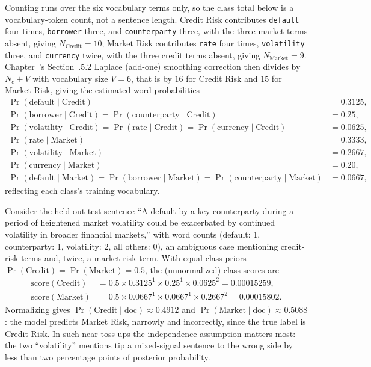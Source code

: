 \documentclass[../ai_in_finance]{subfiles}
\begin{document}
Counting runs over the six vocabulary terms only, so the class total below is a vocabulary-token count, not a sentence length. Credit Risk contributes \texttt{default} four times, \texttt{borrower} three, and \texttt{counterparty} three, with the three market terms absent, giving $N_{\text{Credit}} = 10$; Market Risk contributes \texttt{rate} four times, \texttt{volatility} three, and \texttt{currency} twice, with the three credit terms absent, giving $N_{\text{Market}} = 9$. Chapter~'s Section~.5.2 Laplace (add-one) smoothing correction then divides by $N_c + V$ with vocabulary size $V = 6$, that is by $16$ for Credit Risk and $15$ for Market Risk, giving the estimated word probabilities
\begin{align*}
\Pr(\text{default}\mid\text{Credit}) &= 0.3125, \\
\Pr(\text{borrower}\mid\text{Credit}) = \Pr(\text{counterparty}\mid\text{Credit}) &= 0.25, \\
\Pr(\text{volatility}\mid\text{Credit}) = \Pr(\text{rate}\mid\text{Credit}) = \Pr(\text{currency}\mid\text{Credit}) &= 0.0625, \\[4pt]
\Pr(\text{rate}\mid\text{Market}) &= 0.3333, \\
\Pr(\text{volatility}\mid\text{Market}) &= 0.2667, \\
\Pr(\text{currency}\mid\text{Market}) &= 0.20, \\
\Pr(\text{default}\mid\text{Market}) = \Pr(\text{borrower}\mid\text{Market}) = \Pr(\text{counterparty}\mid\text{Market}) &= 0.0667,
\end{align*}
reflecting each class's training vocabulary.


Consider the held-out test sentence ``A default by a key counterparty during a period of heightened market volatility could be exacerbated by continued volatility in broader financial markets,'' with word counts (default: 1, counterparty: 1, volatility: 2, all others: 0), an ambiguous case mentioning credit-risk terms and, twice, a market-risk term. With equal class priors $\Pr(\text{Credit}) = \Pr(\text{Market}) = 0.5$, the (unnormalized) class scores are
\begin{align*}
\text{score}(\text{Credit}) &= 0.5 \times 0.3125^1 \times 0.25^1 \times 0.0625^2 = 0.00015259, \\
\text{score}(\text{Market}) &= 0.5 \times 0.0667^1 \times 0.0667^1 \times 0.2667^2 = 0.00015802.
\end{align*}
Normalizing gives $\Pr(\text{Credit}\mid\text{doc}) \approx 0.4912$ and $\Pr(\text{Market}\mid\text{doc}) \approx 0.5088$: the model predicts Market Risk, narrowly and incorrectly, since the true label is Credit Risk. In such near-toss-ups the independence assumption matters most: the two ``volatility'' mentions tip a mixed-signal sentence to the wrong side by less than two percentage points of posterior probability.
\end{document}
